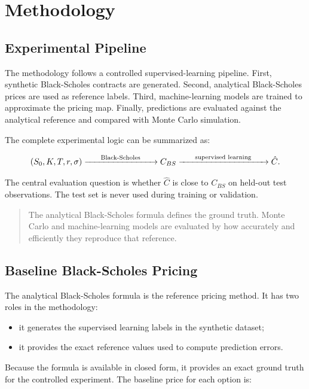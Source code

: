 \chapter{Methodology}

\section{Experimental Pipeline}

The methodology follows a controlled supervised-learning pipeline.
First, synthetic Black-Scholes contracts are generated.
Second, analytical Black-Scholes prices are used as reference labels.
Third, machine-learning models are trained to approximate the pricing map.
Finally, predictions are evaluated against the analytical reference and compared with Monte Carlo simulation.

The complete experimental logic can be summarized as:

\begin{equation}
    (S_0, K, T, r, \sigma)
    \xrightarrow{\hspace{0.6cm}\text{Black-Scholes}\hspace{0.6cm}}
    C_{BS}
    \xrightarrow{\hspace{0.6cm}\text{supervised learning}\hspace{0.6cm}}
    \hat{C}.
\end{equation}

The central evaluation question is whether $\hat{C}$ is close to $C_{BS}$ on held-out test observations.
The test set is never used during training or validation.

\begin{quote}
    The analytical Black-Scholes formula defines the ground truth.
    Monte Carlo and machine-learning models are evaluated by how accurately and efficiently they reproduce that reference.
\end{quote}

\section{Baseline Black-Scholes Pricing}

The analytical Black-Scholes formula is the reference pricing method.
It has two roles in the methodology:

\begin{itemize}
    \item it generates the supervised learning labels in the synthetic dataset;
    \item it provides the exact reference values used to compute prediction errors.
\end{itemize}
Because the formula is available in closed form, it provides an exact ground truth for the controlled experiment.
The baseline price for each option is:

